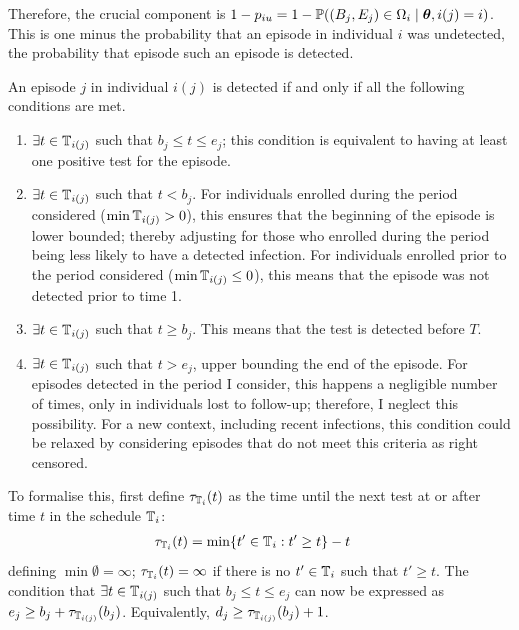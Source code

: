 \documentclass[thesis.tex]{subfiles}
\begin{document}
Therefore, the crucial component is $1 - p_{iu} = 1 - \operatorname{\mathbb{P}}((B_j, E_j) \in \Omega_i \mid \bm{\theta}, i(j) = i)$.
This is one minus the probability that an episode in individual $i$ was undetected, \ie the probability that episode such an episode is detected.

An episode $j$ in individual $i(j)$ is detected if and only if all the following conditions are met.
\begin{enumerate}
    \item $\exists t \in \mathbb{T}_{i(j)}$ such that $b_j \leq t \leq e_j$; this condition is equivalent to having at least one positive test for the episode.
    \item $\exists t \in \mathbb{T}_{i(j)}$ such that $t < b_j$.
      For individuals enrolled during the period considered ($\min \mathbb{T}_{i(j)} > 0$), this ensures that the beginning of the episode is lower bounded; thereby adjusting for those who enrolled during the period being less likely to have a detected infection.
      For individuals enrolled prior to the period considered ($\min \mathbb{T}_{i(j)} \leq 0$), this means that the episode was not detected prior to time 1.
    \item $\exists t \in \mathbb{T}_{i(j)}$ such that $t \geq b_j$.
      This means that the test is detected before $T$.
    \item $\exists t \in \mathbb{T}_{i(j)}$ such that $t > e_j$, upper bounding the end of the episode.
      For episodes detected in the period I consider, this happens a negligible number of times, only in individuals lost to follow-up; therefore, I neglect this possibility.
      For a new context, including recent infections, this condition could be relaxed by considering episodes that do not meet this criteria as right censored.
\end{enumerate}

To formalise this, first define $\tau_{\mathbb{T}_i}(t)$ as the time until the next test at or after time $t$ in the schedule $\mathbb{T}_i$:
\begin{align}
\tau_{\mathbb{T}_i}(t) &= \min \{ t' \in \mathbb{T}_i : t' \geq t \} - t
\end{align}
defining $\min \emptyset = \infty$; \ie $\tau_{\mathbb{T}_i}(t) = \infty$ if there is no $t' \in \mathbb{T}_i$ such that $t' \geq t$.
The condition that $\exists t \in \mathbb{T}_{i(j)}$ such that $b_j \leq t \leq e_j$ can now be expressed as $e_j \geq b_j + \tau_{\mathbb{T}_{i(j)}}(b_j)$.
Equivalently, $d_j \geq \tau_{\mathbb{T}_{i(j)}}(b_j) + 1$.
\end{document}

